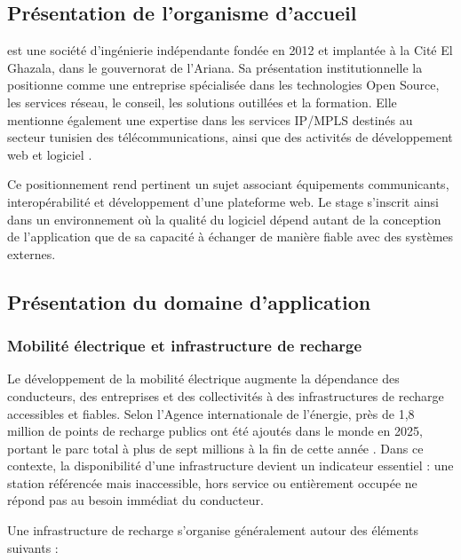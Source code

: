 \subsection{Présentation de l'organisme d'accueil}

\CompanyName{} est une société d'ingénierie indépendante fondée en 2012 et implantée
à la Cité El Ghazala, dans le gouvernorat de l'Ariana. Sa présentation institutionnelle
la positionne comme une entreprise spécialisée dans les technologies Open Source,
les services réseau, le conseil, les solutions outillées et la formation. Elle
mentionne également une expertise dans les services IP/MPLS destinés au secteur
tunisien des télécommunications, ainsi que des activités de développement web et
logiciel \cite{tacticLinkedIn}.

Ce positionnement rend pertinent un sujet associant équipements communicants,
interopérabilité et développement d'une plateforme web. Le stage s'inscrit ainsi
dans un environnement où la qualité du logiciel dépend autant de la conception de
l'application que de sa capacité à échanger de manière fiable avec des systèmes
externes.

\subsection{Présentation du domaine d'application}

\subsubsection{Mobilité électrique et infrastructure de recharge}

Le développement de la mobilité électrique augmente la dépendance des conducteurs,
des entreprises et des collectivités à des infrastructures de recharge accessibles
et fiables. Selon l'Agence internationale de l'énergie, près de 1,8 million de points
de recharge publics ont été ajoutés dans le monde en 2025, portant le parc total à
plus de sept millions à la fin de cette année \cite{ieaGlobalEV2026}. Dans ce contexte,
la disponibilité d'une infrastructure devient un indicateur essentiel : une station
référencée mais inaccessible, hors service ou entièrement occupée ne répond pas au
besoin immédiat du conducteur.

Une infrastructure de recharge s'organise généralement autour des éléments suivants :

